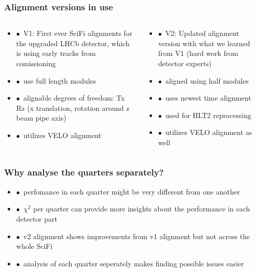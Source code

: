 \documentclass[aspectratio=1610, 12pt]{beamer}
\begin{document}
\begin{frame}\frametitle{Alignment versions in use}
  \begin{columns}
    \begin{column}[c]{0.48\textwidth}
      \begin{itemize}
        \item $\bullet$\, V1: First ever SciFi alignments for the upgraded LHCb detector, which is using early tracks from comissioning
        \item $\bullet$\, use full length modules
        \item $\bullet$\, alignable degrees of freedom: Tx Rz (x translation, rotation around z \to beam pipe axis)
        \item $\bullet$\, utilizes VELO alignment
      \end{itemize}
    \end{column}
    \begin{column}[c]{0.48\textwidth}
      \begin{itemize}
        \item $\bullet$\, V2: Updated alignment version with what we learned from V1 (hard work from detector experts)
        \item $\bullet$\, aligned using half modules
        \item $\bullet$\, uses newest time alignment
        \item $\bullet$\, used for HLT2 reprocessing
        \item $\bullet$\, utilizes VELO alignment as well
      \end{itemize}
    \end{column}
  \end{columns}
\end{frame}

\begin{frame}\frametitle{Why analyse the quarters separately?}
  \begin{itemize}
    \item $\bullet$\, perfomance in each quarter might be very different from one another
    \item $\bullet$\, \to $\chi^2$ per quarter can provide more insights about the performance in each detector part
    \item $\bullet$\, v2 alignment shows improvements from v1 alignment but not across the whole SciFi
    \item $\bullet$\, analysis of each quarter seperately makes finding possible issues easier
  \end{itemize}
\end{frame}
\end{document}
